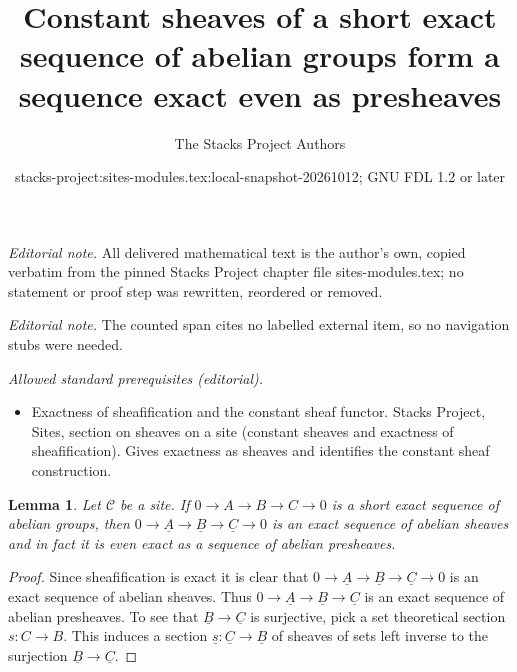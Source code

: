 \documentclass[10pt,a4paper]{amsart}
\title{Constant sheaves of a short exact sequence of abelian groups form a sequence exact even as presheaves}
\author{The Stacks Project Authors}
\date{stacks-project:sites-modules.tex:local-snapshot-20261012; GNU FDL 1.2 or later}
\theoremstyle{plain}
\newtheorem{lemma}[subsection]{Lemma}
\theoremstyle{definition}
\theoremstyle{remark}
\numberwithin{equation}{subsection}
\begin{document}
\maketitle
\noindent\textit{Editorial note.} All delivered mathematical text is the author's own, copied verbatim from the pinned Stacks Project chapter file sites-modules.tex; no statement or proof step was rewritten, reordered or removed.\par\medskip
\noindent\textit{Editorial note.} The counted span cites no labelled external item, so no navigation stubs were needed.\par\medskip
\noindent\textit{Allowed standard prerequisites (editorial).}\begin{itemize}
\item Exactness of sheafification and the constant sheaf functor. Stacks Project, Sites, section on sheaves on a site (constant sheaves and exactness of sheafification). Gives exactness as sheaves and identifies the constant sheaf construction.
\end{itemize}\medskip
\begin{lemma}
\label{lemma-constant-exact}
Let $\mathcal{C}$ be a site. If $0 \to A \to B \to C \to 0$
is a short exact sequence of abelian groups, then
$0 \to \underline{A} \to \underline{B} \to \underline{C} \to 0$
is an exact sequence of abelian sheaves and in fact it is even
exact as a sequence of abelian presheaves.
\end{lemma}

\begin{proof}
Since sheafification is exact it is clear that
$0 \to \underline{A} \to \underline{B} \to \underline{C} \to 0$
is an exact sequence of abelian sheaves. Thus
$0 \to \underline{A} \to \underline{B} \to \underline{C}$
is an exact sequence of abelian presheaves. To see that
$\underline{B} \to \underline{C}$ is surjective, pick a
set theoretical section $s : C \to B$. This induces a
section $\underline{s} : \underline{C} \to \underline{B}$
of sheaves of sets left inverse to the surjection
$\underline{B} \to \underline{C}$.
\end{proof}
\end{document}

